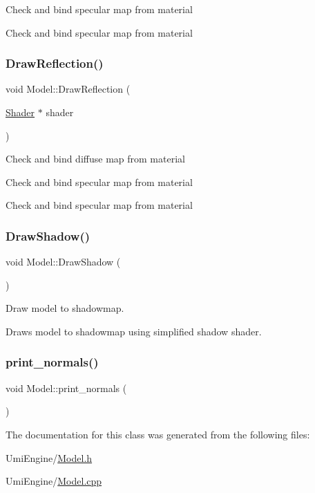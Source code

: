 Check and bind specular map from material

Check and bind specular map from material \mbox{\label{class_model_ae55524ff90fd956b7cb3817a9bab139a}} 
\subsubsection{\texorpdfstring{DrawReflection()}{DrawReflection()}}
{\footnotesize\ttfamily void Model\+::\+Draw\+Reflection (\begin{DoxyParamCaption}\item[{\mbox{\hyperlink{class_shader}{Shader}} $\ast$}]{shader }\end{DoxyParamCaption})}

Check and bind diffuse map from material

Check and bind specular map from material

Check and bind specular map from material \mbox{\label{class_model_ac2e396a05a6b7af011c213dcbd2dae21}} 
\subsubsection{\texorpdfstring{DrawShadow()}{DrawShadow()}}
{\footnotesize\ttfamily void Model\+::\+Draw\+Shadow (\begin{DoxyParamCaption}{ }\end{DoxyParamCaption})}



Draw model to shadowmap. 

Draws model to shadowmap using simplified shadow shader. \mbox{\label{class_model_acc6d38d268db3e4b88bbd32cd28c8f58}} 
\subsubsection{\texorpdfstring{print\_normals()}{print\_normals()}}
{\footnotesize\ttfamily void Model\+::print\+\_\+normals (\begin{DoxyParamCaption}{ }\end{DoxyParamCaption})}



The documentation for this class was generated from the following files\+:\begin{DoxyCompactItemize}
\item 
Umi\+Engine/\mbox{\hyperlink{_model_8h}{Model.\+h}}\item 
Umi\+Engine/\mbox{\hyperlink{_model_8cpp}{Model.\+cpp}}\end{DoxyCompactItemize}
